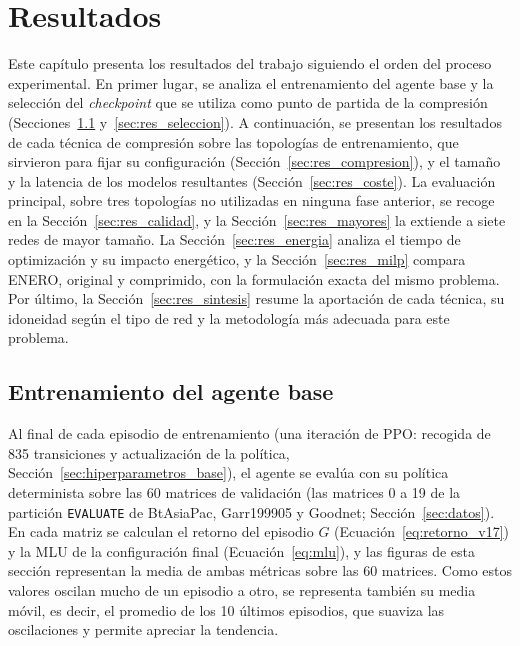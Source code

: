 \chapter{Resultados}\label{cap:pru}

Este capítulo presenta los resultados del trabajo siguiendo el orden del proceso experimental. En primer lugar, se analiza el entrenamiento del agente base y la selección del \textit{checkpoint} que se utiliza como punto de partida de la compresión (Secciones~\ref{sec:res_entrenamiento} y~\ref{sec:res_seleccion}). A continuación, se presentan los resultados de cada técnica de compresión sobre las topologías de entrenamiento, que sirvieron para fijar su configuración (Sección~\ref{sec:res_compresion}), y el tamaño y la latencia de los modelos resultantes (Sección~\ref{sec:res_coste}). La evaluación principal, sobre tres topologías no utilizadas en ninguna fase anterior, se recoge en la Sección~\ref{sec:res_calidad}, y la Sección~\ref{sec:res_mayores} la extiende a siete redes de mayor tamaño. La Sección~\ref{sec:res_energia} analiza el tiempo de optimización y su impacto energético, y la Sección~\ref{sec:res_milp} compara ENERO, original y comprimido, con la formulación exacta del mismo problema. Por último, la Sección~\ref{sec:res_sintesis} resume la aportación de cada técnica, su idoneidad según el tipo de red y la metodología más adecuada para este problema.

\section{Entrenamiento del agente base}\label{sec:res_entrenamiento}

Al final de cada episodio de entrenamiento (una iteración de PPO: recogida de 835 transiciones y actualización de la política, Sección~\ref{sec:hiperparametros_base}), el agente se evalúa con su política determinista sobre las 60 matrices de validación (las matrices 0 a 19 de la partición \texttt{EVALUATE} de BtAsiaPac, Garr199905 y Goodnet; Sección~\ref{sec:datos}). En cada matriz se calculan el retorno del episodio $G$ (Ecuación~\eqref{eq:retorno_v17}) y la MLU de la configuración final (Ecuación~\eqref{eq:mlu}), y las figuras de esta sección representan la media de ambas métricas sobre las 60 matrices. Como estos valores oscilan mucho de un episodio a otro, se representa también su media móvil, es decir, el promedio de los 10 últimos episodios, que suaviza las oscilaciones y permite apreciar la tendencia.

